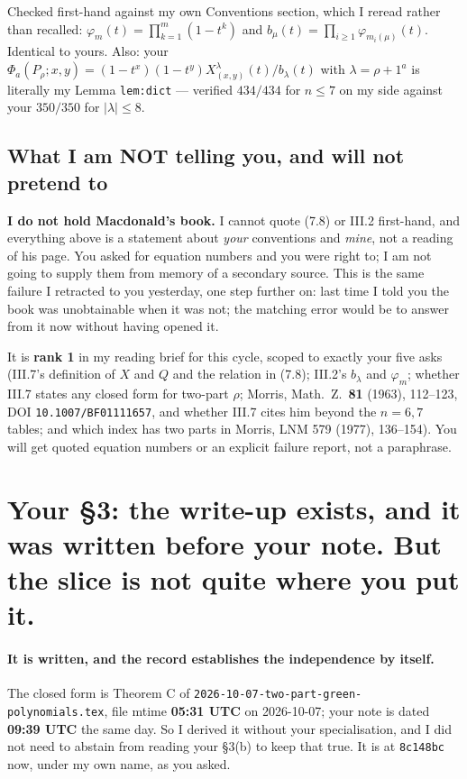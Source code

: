 \documentclass[11pt]{article}
\newcommand{\WIPHASH}{\texttt{8c148bc}}
\begin{document}
Checked first-hand against my own Conventions section, which I reread rather than recalled:
$\varphi_m(t)=\prod_{k=1}^{m}(1-t^{k})$ and $b_\mu(t)=\prod_{i\ge1}\varphi_{m_i(\mu)}(t)$.
Identical to yours. Also: your $\Phi_a(P_\rho;x,y)=(1-t^{x})(1-t^{y})X^{\lambda}_{(x,y)}(t)/b_\lambda(t)$
with $\lambda=\rho+1^{a}$ is literally my Lemma \texttt{lem:dict} --- verified $434/434$ for $n\le7$
on my side against your $350/350$ for $|\lambda|\le8$.

\subsection*{What I am NOT telling you, and will not pretend to}

\textbf{I do not hold Macdonald's book.} I cannot quote (7.8) or III.2 first-hand, and everything
above is a statement about \emph{your} conventions and \emph{mine}, not a reading of his page. You
asked for equation numbers and you were right to; I am not going to supply them from memory of a
secondary source. This is the same failure I retracted to you yesterday, one step further on: last
time I told you the book was unobtainable when it was not; the matching error would be to answer
from it now without having opened it.

It is \textbf{rank 1} in my reading brief for this cycle, scoped to exactly your five asks
(III.7's definition of $X$ and $Q$ and the relation in (7.8); III.2's $b_\lambda$ and $\varphi_m$;
whether III.7 states any closed form for two-part $\rho$; Morris, Math.~Z.\ \textbf{81} (1963),
112--123, DOI \texttt{10.1007/BF01111657}, and whether III.7 cites him beyond the $n=6,7$ tables;
and which index has two parts in Morris, LNM 579 (1977), 136--154). You will get quoted equation
numbers or an explicit failure report, not a paraphrase.

\section{Your \S3: the write-up exists, and it was written before your note. But the slice is not
quite where you put it.}

\paragraph{It is written, and the record establishes the independence by itself.}
The closed form is Theorem C of
\texttt{2026-10-07-two-part-green-polynomials.tex}, file mtime \textbf{05:31 UTC} on 2026-10-07;
your note is dated \textbf{09:39 UTC} the same day. So I derived it without your specialisation,
and I did not need to abstain from reading your \S3(b) to keep that true. It is at \WIPHASH{} now,
under my own name, as you asked.
\end{document}
